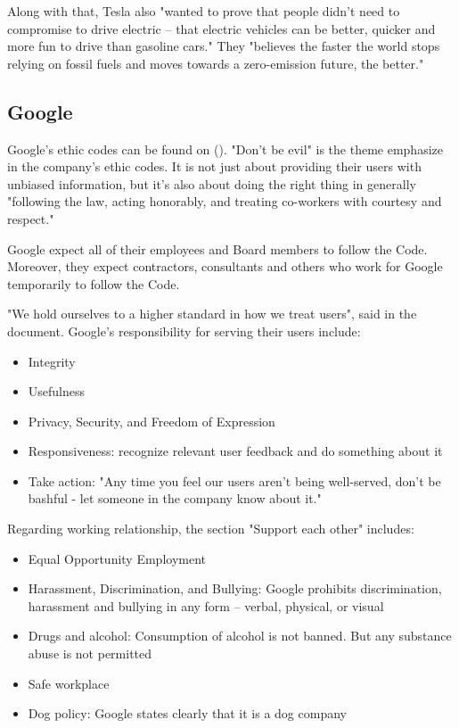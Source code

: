 \documentclass[12pt]{article}
\begin{document}
Along with that, Tesla also "wanted to prove that people didn’t need to compromise to drive electric – that electric vehicles can be better, quicker and more fun to drive than gasoline cars." They "believes the faster the world stops relying on fossil fuels and moves towards a zero-emission future, the better."

\subsection{Google}

Google's ethic codes can be found on (\cite{go17}). "Don't be evil" is the theme emphasize in the company's ethic codes. It is not just about providing their users with unbiased information, but it's also about doing the right thing in generally "following the law, acting honorably, and treating co-workers with courtesy and respect." 

Google expect all of their employees and Board members to follow the Code. Moreover, they expect contractors, consultants and others who work for Google temporarily to follow the Code.

"We hold ourselves to a higher standard in how we treat users", said in the document. Google's responsibility for serving their users include:

\begin{itemize}
	\item{Integrity}
	\item{Usefulness}
	\item{Privacy, Security, and Freedom of Expression}
	\item{Responsiveness: recognize relevant user feedback and do something about it}
	\item{Take action: "Any time you feel our users aren’t being well-served, don’t be bashful - let someone in the company know about it."}
\end{itemize}

Regarding working relationship, the section "Support each other" includes:

\begin{itemize}
	\item{Equal Opportunity Employment}
	\item{Harassment, Discrimination, and Bullying: Google prohibits discrimination, harassment and bullying in any form – verbal, physical, or visual}
	\item{Drugs and alcohol: Consumption of alcohol is not banned. But any substance abuse is not permitted}
	\item{Safe workplace}
	\item{Dog policy: Google states clearly that it is a dog company}
\end{itemize}
\end{document}
